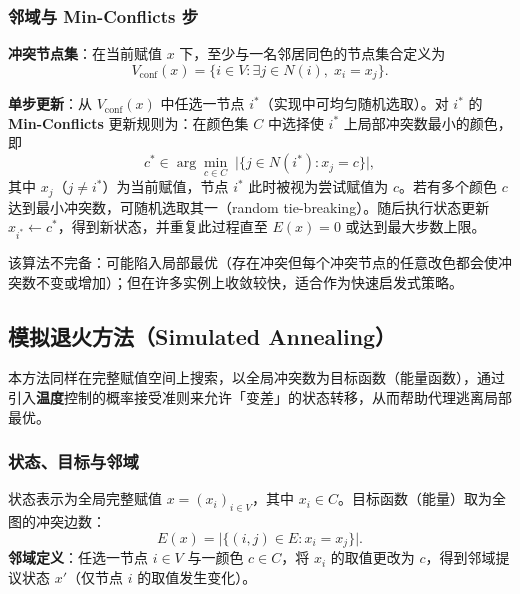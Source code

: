 \subsubsection{邻域与 Min-Conflicts 步}
\label{sec:mc-step}

\textbf{冲突节点集}：在当前赋值 $x$ 下，至少与一名邻居同色的节点集合定义为
\begin{equation}
  V_{\mathrm{conf}}(x) = \bigl\{ i \in V : \exists j \in N(i),\; x_i = x_j \bigr\}.
\end{equation}

\textbf{单步更新}：从 $V_{\mathrm{conf}}(x)$ 中任选一节点 $i^{*}$（实现中可均匀随机选取）。对 $i^{*}$ 的 \textbf{Min-Conflicts} 更新规则为：在颜色集 $C$ 中选择使 $i^{*}$ 上局部冲突数最小的颜色，即
\begin{equation}
  c^* \in \arg\min_{c \in C} \; \bigl| \bigl\{ j \in N(i^{*}) : x_j = c \bigr\} \bigr|,
\end{equation}
其中 $x_j$（$j \neq i^{*}$）为当前赋值，节点 $i^{*}$ 此时被视为尝试赋值为 $c$。若有多个颜色 $c$ 达到最小冲突数，可随机选取其一（random tie-breaking）。随后执行状态更新 $x_{i^{*}} \leftarrow c^*$，得到新状态，并重复此过程直至 $E(x) = 0$ 或达到最大步数上限。

该算法不完备：可能陷入局部最优（存在冲突但每个冲突节点的任意改色都会使冲突数不变或增加）；但在许多实例上收敛较快，适合作为快速启发式策略。

\subsection{模拟退火方法（Simulated Annealing）}
\label{sec:simulated-annealing}

本方法同样在完整赋值空间上搜索，以全局冲突数为目标函数（能量函数），通过引入\textbf{温度}控制的概率接受准则来允许「变差」的状态转移，从而帮助代理逃离局部最优。

\subsubsection{状态、目标与邻域}
\label{sec:sa-state}

状态表示为全局完整赋值 $x = (x_i)_{i\in V}$，其中 $x_i \in C$。目标函数（能量）取为全图的冲突边数：
\begin{equation}
  E(x) = \bigl| \bigl\{ (i,j) \in E : x_i = x_j \bigr\} \bigr|.
\end{equation}
\textbf{邻域定义}：任选一节点 $i \in V$ 与一颜色 $c \in C$，将 $x_i$ 的取值更改为 $c$，得到邻域提议状态 $x'$（仅节点 $i$ 的取值发生变化）。

